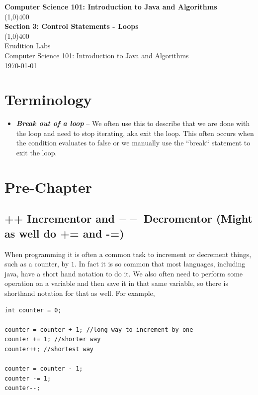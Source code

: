 \documentclass[11]{article}
\begin{document}
\begin{titlepage}
\begin{center}
\vspace{1cm}
\Large{\textbf{Computer Science 101: Introduction to Java and Algorithms}}\\
\vfill
\line(1,0){400}\\
\huge{\textbf{Section 3: Control Statements - Loops}}\\
\line(1,0){400}\\
\vfill
Erudition Labs\\
Computer Science 101: Introduction to Java and Algorithms\\
\today\\
\end{center}
\end{titlepage}

\tableofcontents
\thispagestyle{empty}
\clearpage
\setcounter{page}{1}

\section{Terminology}
\begin{itemize}
  \item \textbf{\textit{Break out of a loop}} --
  We often use this to describe that we are done with the loop and need to stop iterating, aka exit the loop. This often occurs when the condition evaluates to false or we manually use the ``break`` statement to exit the loop.

\end{itemize}

\section{Pre-Chapter}
\subsection{++ Incrementor and $--$ Decromentor (Might as well do += and -=)}
When programming it is often a common task to increment or decrement things, such as a counter, by $1$. In fact it is so common that most languages, including java, have a short hand notation to do it. We also often need to perform some operation on a variable and then save it in that same variable, so there is shorthand notation for that as well. For example,

\begin{lstlisting}
int counter = 0;

counter = counter + 1; //long way to increment by one
counter += 1; //shorter way
counter++; //shortest way

counter = counter - 1;
counter -= 1;
counter--;
\end{lstlisting}
\end{document}
